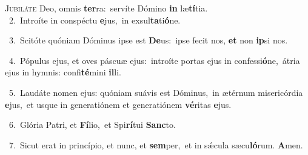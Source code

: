\lettrine{\initial\textcolor{\initialcolor}{J}}{ubiláte} Deo, omnis \textbf{ter}\-ra:~\star servíte Dómino \textbf{in} læ\-\textbf{tí}\-tia.\\
{\numbfont\textcolor{\numbcolor}{~2.}}~Introíte in conspéctu \textbf{e}\-jus,~\star in exsul\-\textbf{ta}\-ti\-\textbf{ó}\-ne.\par
{\numbfont\textcolor{\numbcolor}{~3.}}~Scitóte quóniam Dóminus ipse est \textbf{De}\-us:~\star ipse fecit nos, \textbf{et} non \textbf{ip}\-si nos.\par
{\numbfont\textcolor{\numbcolor}{~4.}}~Pópulus ejus, et oves páscuæ ejus:~\dagger introíte portas ejus in confessi\-\textbf{ó}\-ne,~\star átria ejus in hymnis: confi\-\textbf{té}\-mini \textbf{il}\-li.\par
{\numbfont\textcolor{\numbcolor}{~5.}}~Laudáte nomen ejus: quóniam suávis est Dóminus,~\dagger in ætérnum misericórdia \textbf{e}\-jus,~\star et usque in generatiónem et generatiónem \textbf{vé}\-ritas \textbf{e}\-jus.\par
{\numbfont\textcolor{\numbcolor}{~6.}}~Glória Patri, et \textbf{Fí}\-lio,~\star et Spi\-\textbf{rí}\-tui \textbf{Sanc}\-to.\par
{\numbfont\textcolor{\numbcolor}{~7.}}~Sicut erat in princípio, et nunc, et \textbf{sem}\-per,~\star et in sǽcula sæcu\-\textbf{ló}\-rum. \textbf{A}\-men.\par
